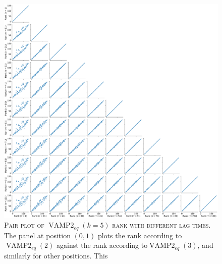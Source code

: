 \documentclass{article}
\begin{document}
\begin{figure}
    \centering
    \includegraphics[width=1.0\textwidth]{SI_figures/1fme_vampeq_rank_vs_lag_pairplot_k5.pdf}
    \caption{\textsc{Pair plot of $\operatorname{VAMP2}_{eq}(k=5)$ rank with different lag times.} The panel at position $(0,1)$ plots the rank according to$\operatorname{VAMP2}_{eq}(2)$ against the  rank according to$\operatorname{VAMP2}_{eq}(3)$, and similarly for other positions. This }
    \label{fig:vampeq5_rank_vs_lag_pairplot}
\end{figure}
\end{document}
